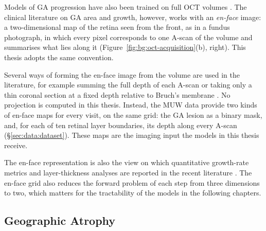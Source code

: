 Models of GA progression have also been trained on full OCT volumes
\citep{Mai2024,Lachinov2024}. The clinical literature on GA area and
growth, however, works with an \emph{en-face} image: a two-dimensional map of the
retina seen from the front, as in a fundus photograph, in which every pixel
corresponds to one A-scan of the volume and summarises what lies along it
\citep{Pilotto2015,Chu2022,Yehoshua2011,Vallino2024}
(Figure~\ref{fig:bg:oct-acquisition}(b), right). This thesis adopts the
same convention.

Several ways of forming the en-face image from the volume are used in the
literature, for example summing the full depth of each A-scan
\citep{Yehoshua2011} or taking only a thin coronal section at a fixed depth
relative to Bruch's membrane \citep{Pilotto2015}. No projection is computed in this thesis. Instead, the MUW
data provide two kinds of en-face maps for every visit, on the same grid:
the GA lesion as a binary mask, and, for each of ten retinal layer
boundaries, its depth along every A-scan (\S\ref{sec:data:dataset}). These
maps are the imaging input the models in this thesis receive.

The en-face representation is also the view on which quantitative
growth-rate metrics and layer-thickness analyses are reported in the
recent literature \citep{Chu2022,Vogl2021,Vallino2024}. The en-face grid
also reduces the forward problem of each step from three dimensions to
two, which matters for the tractability of the models in the following
chapters.


\subsection{Geographic Atrophy}
\label{sec:background:ga-oct:disease}

